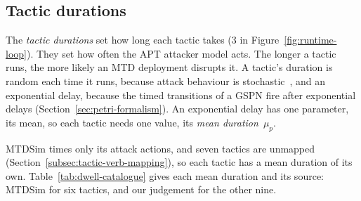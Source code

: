 \documentclass{cshonours}
\begin{document}
\subsection{Tactic durations}
\label{subsec:dwell-times}

The \emph{tactic durations} set how long each tactic takes (3 in
Figure~\ref{fig:runtime-loop}). They set how often the APT attacker
model acts. The longer a tactic runs, the more likely an MTD deployment
disrupts it. A tactic's duration is random each time it runs, because attack
behaviour is stochastic~\citep{holm2014, madan2004, bland2020}, and an
exponential delay, because the timed transitions of a GSPN fire after
exponential delays (Section~\ref{sec:petri-formalism}). An exponential delay
has one parameter, its mean, so each tactic needs one value, its
\emph{mean duration}~$\mu_p$.

MTDSim times only its attack actions, and seven tactics are unmapped
(Section~\ref{subsec:tactic-verb-mapping}), so each tactic has a mean
duration of its own. Table~\ref{tab:dwell-catalogue} gives each mean duration and its source:
MTDSim for six tactics, and our judgement for the other nine.


\end{document}
